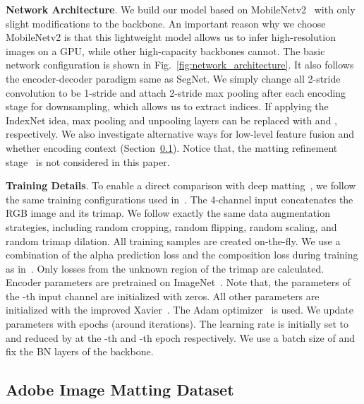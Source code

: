 \documentclass[10pt,twocolumn,letterpaper]{article}
\begin{document}
\vspace{3pt}
\noindent\textbf{Network Architecture}. We build our model based on MobileNetv2~\cite{sandler2018mobilenetv2} with only slight modifications to the backbone. An important reason why we choose MobileNetv2 is that this lightweight model allows us to infer high-resolution images on a GPU, while other high-capacity backbones cannot. The basic network configuration is shown in Fig.~\ref{fig:network_architecture}. It also follows the encoder-decoder paradigm same as SegNet. We simply change all 2-stride convolution to be 1-stride and attach 2-stride  max pooling after each encoding stage for downsampling, which allows us to extract indices. If applying the IndexNet idea, max pooling and unpooling layers can be replaced with  and , respectively. We also investigate alternative ways for low-level feature fusion and whether encoding context (Section~\ref{subsec:ablation_study}). Notice that, the matting refinement stage~\cite{xu2017deep} is not considered in this paper.

\vspace{3pt}
\noindent\textbf{Training Details}. To enable a direct comparison with deep matting~\cite{xu2017deep}, we follow the same training configurations used in~\cite{xu2017deep}. The 4-channel input concatenates the RGB image and its trimap. We follow exactly the same data augmentation strategies, including  random cropping, random flipping, random scaling, and random trimap dilation. All training samples are created on-the-fly. We use a combination of the alpha prediction loss and the composition loss during training as in~\cite{xu2017deep}. Only losses from the unknown region of the trimap are calculated. Encoder parameters are pretrained on ImageNet~\cite{deng2009imagenet}. Note that, the parameters of the -th input channel are initialized with zeros. All other parameters are initialized with the improved Xavier~\cite{he2015delving}. The Adam optimizer~\cite{kingma2015adam} is used. We update parameters with  epochs (around  iterations). The learning rate is initially set to  and reduced by  at the -th and -th epoch respectively. We use a batch size of  and fix the BN layers of the backbone.

\subsection{Adobe Image Matting Dataset}
\label{subsec:ablation_study}
\end{document}
